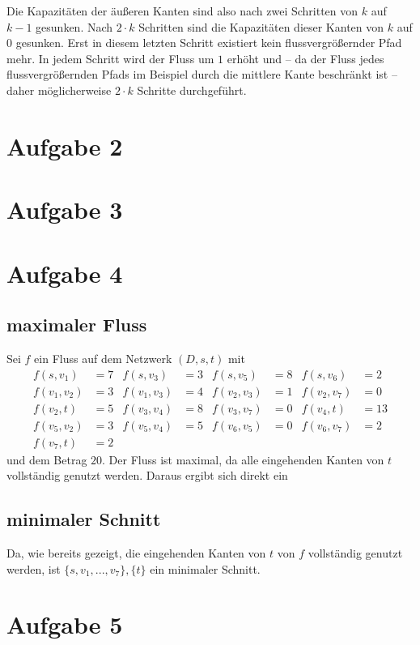 \documentclass[a4paper]{article}
\begin{document}
Die Kapazitäten der äußeren Kanten sind also nach zwei Schritten von $k$
auf $k-1$ gesunken. Nach $2 \cdot k$ Schritten sind die Kapazitäten dieser
Kanten von $k$ auf $0$ gesunken. Erst in diesem letzten Schritt existiert
kein flussvergrößernder Pfad mehr. In jedem Schritt wird der Fluss um $1$
erhöht und -- da der Fluss jedes flussvergrößernden Pfads im Beispiel durch 
die mittlere Kante beschränkt ist -- daher möglicherweise $2 \cdot k$ Schritte
durchgeführt.

\section{Aufgabe 2}

\section{Aufgabe 3}

\section{Aufgabe 4}

\subsection{maximaler Fluss}
Sei $f$ ein Fluss auf dem Netzwerk $(D, s, t)$ mit
\begin{align*}
f(s, v_1) &= 7 		& f(s, v_3) &= 3 	& f(s, v_5) &= 8 	& f(s, v_6) &= 2 \\
f(v_1, v_2) &= 3 	& f(v_1, v_3) &= 4	& f(v_2, v_3) &= 1	& f(v_2, v_7) &= 0 \\
f(v_2, t) &= 5		& f(v_3, v_4) &= 8	& f(v_3, v_7) &= 0	& f(v_4, t) &= 13 \\
f(v_5, v_2) &= 3	& f(v_5, v_4) &= 5	& f(v_6, v_5) &= 0	& f(v_6, v_7) &= 2 \\
f(v_7, t) &= 2
\end{align*}
und dem Betrag $20$. Der Fluss ist maximal, da alle eingehenden Kanten von $t$
vollständig genutzt werden. Daraus ergibt sich direkt ein
\subsection{minimaler Schnitt}
Da, wie bereits gezeigt, die eingehenden Kanten von $t$ von $f$ vollständig
genutzt werden, ist $\{s, v_1, ..., v_7\}, \{t\}$ ein minimaler Schnitt.

\section{Aufgabe 5}
\end{document}
